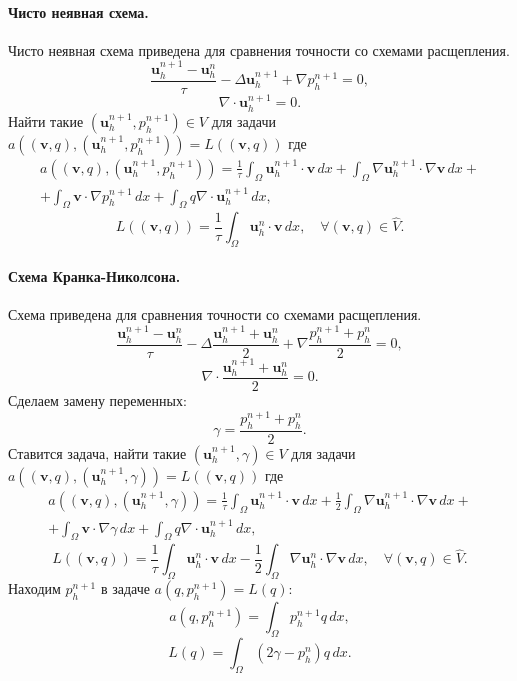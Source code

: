 \documentclass[12pt]{article}
\begin{document}
\paragraph{Чисто неявная схема.} Чисто неявная схема приведена для сравнения точности со схемами расщепления.
\begin{equation} \label{eq:scheme-impl-1}
\frac{{\bm u}_h^{n+1}-{\bm u}_h^n}{\tau} - \Delta {\bm u}_h^{n+1}+\nabla p_h^{n+1} = 0,
\end{equation}
$$
\nabla \cdot {\bm u}_h^{n+1} = 0.
$$
Найти такие $({\bm u}_h^{n+1}, p_h^{n+1}) \in V$ для задачи $a(({\bm v},q), ({\bm u}_h^{n+1},p_h^{n+1})) = L(({\bm v},q))$ где
\begin{eqnarray}
a(({\bm v},q), ({\bm u}_h^{n+1},p_h^{n+1})) = \frac{1}{\tau} \int_\Omega {\bm u_h^{n+1}} \cdot {\bm v} \, dx + \int_\Omega \nabla {\bm u_h^{n+1}} \cdot \nabla {\bm v} \, dx + \nonumber\\ 
+ \int_\Omega {\bm v} \cdot \nabla p_h^{n+1} \, dx + \int_\Omega q \nabla \cdot {\bm u_h^{n+1}} \, dx,
\end{eqnarray}
$$
L(({\bm v},q)) = \frac{1}{\tau} \int_\Omega {\bm u}_h^n \cdot {\bm v} \, dx, \quad \forall ({\bm v},q) \in \hat V.
$$


\paragraph{Схема Кранка-Николсона.} Схема приведена для сравнения точности со схемами расщепления.
$$
\frac{{\bm u}_h^{n+1}-{\bm u}_h^n}{\tau} - \Delta \frac{{\bm u}_h^{n+1}+{\bm u}_h^n}{2}+\nabla \frac{p_h^{n+1}+p_h^n}{2}=0,
$$
$$
\nabla \cdot \frac{{\bm u}_h^{n+1}+{\bm u}_h^{n}}{2}=0.
$$
Сделаем замену переменных:
$$
\gamma = \frac{p_h^{n+1} + p_h^{n}}{2}.
$$
Ставится задача, найти такие $({\bm u}_h^{n+1}, \gamma) \in V$ для задачи $a(({\bm v},q), ({\bm u}_h^{n+1},\gamma)) = L(({\bm v},q))$ где
\begin{eqnarray}
a(({\bm v}, q), ({\bm u}_h^{n+1}, \gamma)) = \frac{1}{\tau} \int_\Omega {\bm u_h^{n+1}} \cdot {\bm v} \, dx + \frac{1}{2} \int_\Omega \nabla {\bm u_h^{n+1}} \cdot \nabla {\bm v} \, dx + \nonumber\\ 
+ \int_\Omega {\bm v} \cdot \nabla \gamma \, dx + \int_\Omega q \nabla \cdot {\bm u_h^{n+1}} \, dx,
\end{eqnarray}
$$
L(({\bm v},q)) = \frac{1}{\tau} \int_\Omega {\bm u}_h^n \cdot {\bm v} \, dx - \frac{1}{2} \int_\Omega \nabla {\bm u}_h^n \cdot \nabla {\bm v} \, dx, \quad \forall ({\bm v},q) \in \hat V.
$$
Находим $p_h^{n+1}$ в задаче $a(q, p_h^{n+1})=L(q)$:
$$
a(q, p_h^{n+1})=\int_\Omega p_h^{n+1} q \, dx,
$$
$$
L(q)=\int_\Omega (2\gamma - p_h^{n}) q \, dx.
$$
\end{document}
